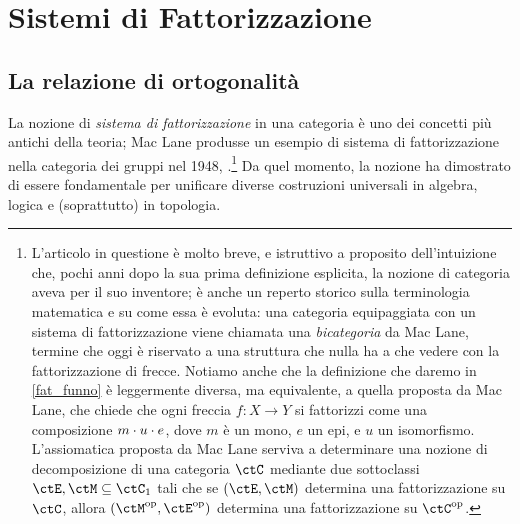 \chapter{Sistemi di Fattorizzazione}
\label{cap_fattorizzazione}
\section{La relazione di ortogonalità}
La nozione di \emph{sistema di fattorizzazione} in una categoria è uno dei concetti più antichi della teoria; Mac Lane produsse un esempio di sistema di fattorizzazione nella categoria dei gruppi nel 1948, \cite{maclane_grp_duality}.\footnote{L'articolo in questione è molto breve, e istruttivo a proposito dell'intuizione che, pochi anni dopo la sua prima definizione esplicita, la nozione di categoria aveva per il suo inventore; è anche un reperto storico sulla terminologia matematica e su come essa è evoluta: una categoria equipaggiata con un sistema di fattorizzazione viene chiamata una \emph{bicategoria} da Mac Lane, termine che oggi è riservato a una struttura che nulla ha a che vedere con la fattorizzazione di frecce. Notiamo anche che la definizione che daremo in \ref{fat_funno} è leggermente diversa, ma equivalente, a quella proposta da Mac Lane, che chiede che ogni freccia \(f \colon X\to Y\) si fattorizzi come una composizione \(m\cdot u\cdot e\), dove \(m\) è un mono, \(e\) un epi, e \(u\) un isomorfismo. L'assiomatica proposta da Mac Lane serviva a determinare una nozione di decomposizione di una categoria \(\ctC\) mediante due sottoclassi \(\ctE,\ctM\subseteq\ctC_1\) tali che se \((\ctE,\ctM)\) determina una fattorizzazione su \(\ctC\), allora \((\ctM^\op,\ctE^\op)\) determina una fattorizzazione su \(\ctC^\op\).} Da quel momento, la nozione ha dimostrato di essere fondamentale per unificare diverse costruzioni universali in algebra, logica e (soprattutto) in topologia.

